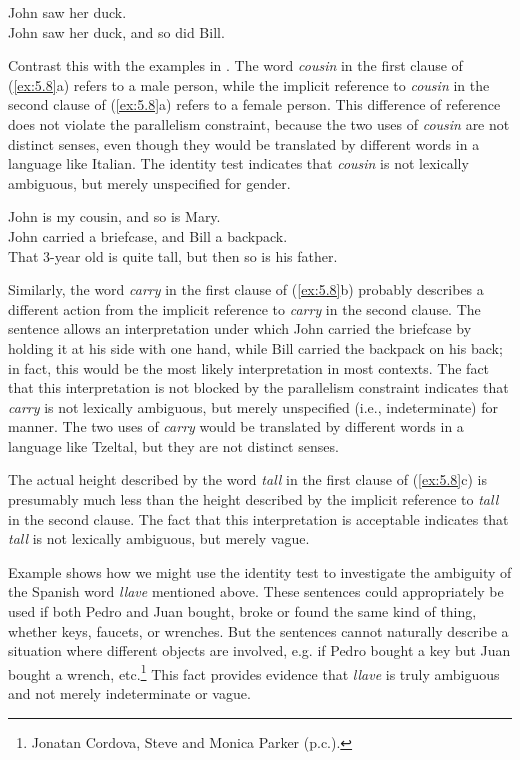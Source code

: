 \ea \label{ex:5.7}
\ea John saw her duck.\\
\ex John saw her duck, and so did Bill.
\z
                       \z


Contrast this with the examples in . The word \textit{cousin} in the first clause of (\ref{ex:5.8}a) refers to a male person, while the implicit reference to \textit{cousin} in the second clause of (\ref{ex:5.8}a) refers to a female person. This difference of reference does not violate the parallelism constraint, because the two uses of \textit{cousin} are not distinct senses, even though they would be translated by different words in a language like Italian. The identity test indicates that \textit{cousin} is not lexically ambiguous, but merely unspecified for gender.


\ea \label{ex:5.8}
\ea John is my cousin, and so is Mary.\\
\ex John carried a briefcase, and Bill a backpack.\\
\ex That 3-year old is quite tall, but then so is his father.
                       \z
\z


Similarly, the word \textit{carry} in the first clause of (\ref{ex:5.8}b) probably describes a different action from the implicit reference to \textit{carry} in the second clause. The sentence allows an interpretation under which John carried the briefcase by holding it at his side with one hand, while Bill carried the backpack on his back; in fact, this would be the most likely interpretation in most contexts. The fact that this interpretation is not blocked by the parallelism constraint indicates that \textit{carry} is not lexically ambiguous, but merely unspecified (i.e., indeterminate) for manner. The two uses of \textit{carry} would be translated by different words in a language like Tzeltal, but they are not distinct senses.



The actual height described by the word \textit{tall} in the first clause of (\ref{ex:5.8}c) is presumably much less than the height described by the implicit reference to \textit{tall} in the second clause. The fact that this interpretation is acceptable indicates that \textit{tall} is not lexically ambiguous, but merely vague.



Example  shows how we might use the identity test to investigate the ambiguity of the Spanish word \textit{llave} mentioned above. These sentences could appropriately be used if both Pedro and Juan bought, broke or found the same kind of thing, whether keys, faucets, or wrenches. But the sentences cannot naturally describe a situation where different objects are involved, e.g. if Pedro bought a key but Juan bought a wrench, etc.\footnote{Jonatan Cordova, Steve and Monica Parker (p.c.).} This fact provides evidence that \textit{llave} is truly ambiguous and not merely indeterminate or vague.



